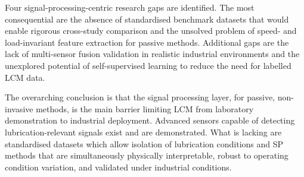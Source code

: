 Four signal-processing-centric research gaps are identified. The most consequential are the absence of standardised benchmark datasets that would enable rigorous cross-study comparison and the unsolved problem of speed- and load-invariant feature extraction for passive methods. Additional gaps are the lack of multi-sensor fusion validation in realistic industrial environments and the unexplored potential of self-supervised learning to reduce the need for labelled LCM data.

The overarching conclusion is that the signal processing layer, for passive, non-invasive methods, is the main barrier limiting LCM from laboratory demonstration to industrial deployment. Advanced sensors capable of detecting lubrication-relevant signals exist and are demonstrated. What is lacking are standardised datasets which allow isolation of lubrication conditions and SP methods that are simultaneously physically interpretable, robust to operating condition variation, and validated under industrial conditions.
